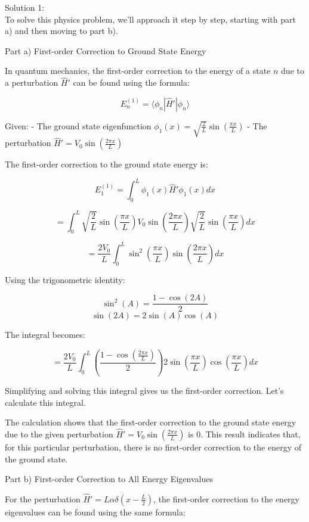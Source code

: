 \documentclass[a4paper,11pt]{article}
\begin{document}
\bigskip

\noindent Solution 1: \\

To solve this physics problem, we'll approach it step by step, starting with part a) and then moving to part b).

Part a) First-order Correction to Ground State Energy

In quantum mechanics, the first-order correction to the energy of a state \( n \) due to a perturbation \( \hat{H}' \) can be found using the formula:

\[ E_n^{(1)} = \langle \phi_n | \hat{H}' | \phi_n \rangle \]

Given:
- The ground state eigenfunction \( \phi_1(x) = \sqrt{\frac{2}{L}} \sin\left(\frac{\pi x}{L} \right) \)
- The perturbation \( \hat{H}' = V_0 \sin\left(\frac{2 \pi x}{L} \right) \)

The first-order correction to the ground state energy is:

\[ E_1^{(1)} = \int_0^L \phi_1(x) \hat{H}' \phi_1(x) dx \]

\[ = \int_0^L \sqrt{\frac{2}{L}} \sin\left(\frac{\pi x}{L} \right) V_0 \sin\left(\frac{2 \pi x}{L} \right) \sqrt{\frac{2}{L}} \sin\left(\frac{\pi x}{L} \right) dx \]

\[ = \frac{2V_0}{L} \int_0^L \sin^2\left(\frac{\pi x}{L} \right) \sin\left(\frac{2 \pi x}{L} \right) dx \]

Using the trigonometric identity:

\[ \sin^2(A) = \frac{1 - \cos(2A)}{2} \]
\[ \sin(2A) = 2\sin(A)\cos(A) \]

The integral becomes:

\[ = \frac{2V_0}{L} \int_0^L \left(\frac{1 - \cos\left(\frac{2\pi x}{L}\right)}{2}\right) 2\sin\left(\frac{\pi x}{L}\right)\cos\left(\frac{\pi x}{L}\right) dx \]

Simplifying and solving this integral gives us the first-order correction. Let's calculate this integral.

The calculation shows that the first-order correction to the ground state energy due to the given perturbation \( \hat{H}' = V_0 \sin\left(\frac{2 \pi x}{L} \right) \) is \( 0 \). This result indicates that, for this particular perturbation, there is no first-order correction to the energy of the ground state.

Part b) First-order Correction to All Energy Eigenvalues

For the perturbation \( \hat{H}' = L\alpha \delta\left(x - \frac{L}{2} \right) \), the first-order correction to the energy eigenvalues can be found using the same formula:
\end{document}
